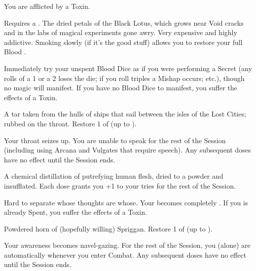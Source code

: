    You are afflicted by a  Toxin.



   Requires a . The dried petals of the Black Lotus, which grows near Void cracks and in the labs of magical experiments gone awry. Very expensive and highly addictive.  Smoking slowly (if it's the good stuff) allows you to restore your full Blood \POOL.

    Immediately try  your unspent Blood Dice as if you were performing a Secret (any rolls of a 1 or a 2 loses the die; if you roll triples a Mishap occurs; etc.), though no magic will manifest. If you have no Blood Dice to manifest, you suffer the effects of a  Toxin.





  A tar taken from the hulls of ships that sail between the isles of the Lost Cities; rubbed on the throat. Restore 1 \UD of \PRE (up to \MAX).

   Your throat seizes up.  You are unable to speak for the rest of the Session (including using Arcana and Vulgates that require speech). Any subsequent doses have no effect until the Session ends.



  A chemical distillation of putrefying human flesh, dried to a powder and insufflated. Each dose grants you +1 to your \INT tries for the rest of the Session.

    Hard to separate whose thoughts are whose. Your \AWA becomes completely . If you \AWA is already Spent, you suffer the effects of a  Toxin.



  Powdered horn of (hopefully willing) Spriggan. Restore 1 \UD of \AWA (up to \MAX).

   Your awareness becomes navel-gazing. For the rest of the Session, you (alone) are automatically  whenever you enter Combat. Any subsequent doses have no effect until the Session ends.


